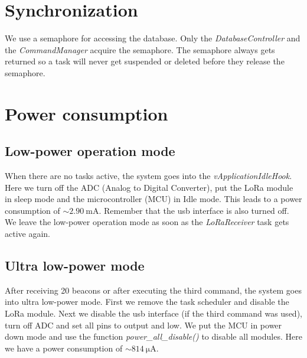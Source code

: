 \documentclass{scrartcl}
\begin{document}
\section{Synchronization}
We use a semaphore for accessing the database. Only the \textit{DatabaseController} and the \textit{CommandManager} acquire the semaphore.
The semaphore always gets returned so a task will never get suspended or deleted before they release the semaphore.

\newpage

\section{Power consumption}
\subsection{Low-power operation mode}
When there are no tasks active, the system goes into the \textit{vApplicationIdleHook}.
Here we turn off the ADC (Analog to Digital Converter),
put the LoRa module in sleep mode and the microcontroller (MCU) in Idle mode.
This leads to a power consumption of $\sim \SI{2.90}{\milli\ampere}$.
Remember that the usb interface is also turned off.
We leave the low-power operation mode as soon as the \textit{LoRaReceiver} task gets active again.

\subsection{Ultra low-power mode}
After receiving 20 beacons or after executing the third command, the system goes into ultra low-power mode.
First we remove the task scheduler and disable the LoRa module.
Next we disable the usb interface (if the third command was used), turn off ADC and set all pins to output and low.
We put the MCU in power down mode and use the function \textit{power\_all\_disable()} to disable all modules.
Here we have a power consumption of $\sim \SI{814}{\micro\ampere}$.
\end{document}

